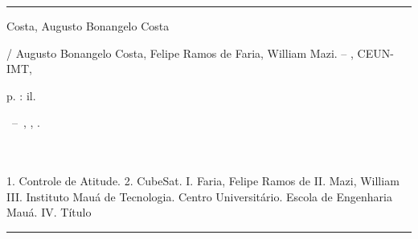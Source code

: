 \documentclass[
	12pt,				%
	openany,			%
	twoside,			%
	a4paper,			%
	english,			%
	french,				%
	spanish,			%
	brazil,				%
	oldfontcommands
	]{abntex2}
\begin{document}
\frenchspacing


\imprimircapa

\imprimirfolhaderosto*


%
%     
\begin{fichacatalografica}
	\vspace*{\fill}					%
	\hrule							%
	\begin{center}					%
	\begin{minipage}[c]{12.5cm}		%
	
	Costa, Augusto Bonangelo Costa
	
	\hspace{0.5cm} \imprimirtitulo  / Augusto Bonangelo Costa, Felipe Ramos de Faria, William Mazi. --
	\imprimirlocal, CEUN-IMT, \imprimirdata
	
	\hspace{0.5cm} \pageref{LastPage} p. : il. \\
	
	\hspace{0.5cm}
	\parbox[t]{\textwidth}{\imprimirtipotrabalho~--~\imprimirinstituicao,
	\imprimirlocal, \imprimirdata.}\\
	
	\hspace{0.5cm} \imprimirorientadorRotulo~\imprimirorientador\\
	
	\hspace{0.5cm}
		1. Controle de Atitude.
		2. CubeSat.
		I. Faria, Felipe Ramos de
		II. Mazi, William
		III. Instituto Mauá de Tecnologia. Centro Universitário. Escola de Engenharia Mauá.
		IV. Título\\ 			
	
	
	\end{minipage}
	\end{center}
	\hrule
\end{fichacatalografica}
\end{document}
